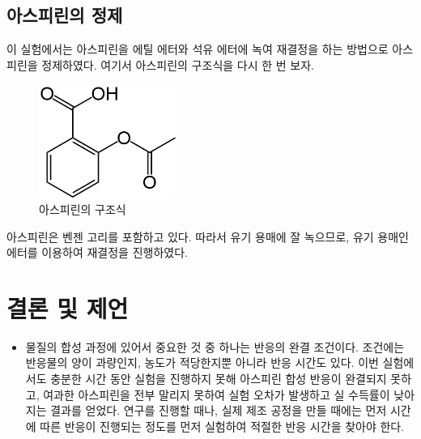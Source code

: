 \documentclass{GSHS-chemexp}
\begin{document}
	\subsection{아스피린의 정제}
	이 실험에서는 아스피린을 에틸 에터와 석유 에터에 녹여
	재결정을 하는 방법으로 아스피린을 정제하였다.
	여기서 아스피린의 구조식을 다시 한 번 보자.
	\begin{figure}[H]
		\centering
		\includegraphics[height=10em]{Aspirin-skeletal.png}
		\caption{아스피린의 구조식}
	\end{figure}
	
	아스피린은 벤젠 고리를 포함하고 있다. 따라서 유기 용매에 잘 녹으므로, 유기 용매인 에터를 이용하여 재결정을 진행하였다.
	
	\section{결론 및 제언}
	\begin{itemize}
		\item 물질의 합성 과정에 있어서 중요한 것 중 하나는
		반응의 완결 조건이다. 조건에는 반응물의 양이 과량인지,
		농도가 적당한지뿐 아니라 반응 시간도 있다.
		이번 실험에서도 충분한 시간 동안 실험을 진행하지 못해
		아스피린 합성 반응이 완결되지 못하고,
		여과한 아스피린을 전부 말리지 못하여 실험 오차가 발생하고
		실 수득률이 낮아지는 결과를 얻었다.
		연구를 진행할 때나, 실제 제조 공정을 만들 때에는
		먼저 시간에 따른 반응이 진행되는 정도를 먼저 실험하여
		적절한 반응 시간을 찾아야 한다.
	\end{itemize}
	
			
\end{document}
